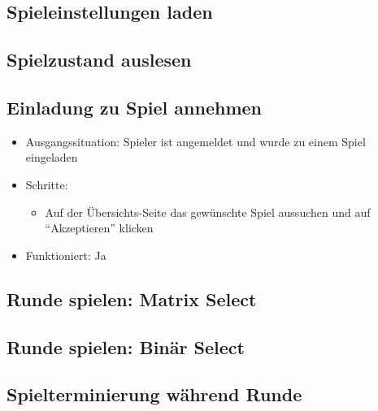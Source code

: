 \documentclass[a4paper]{scrreprt}
\begin{document}
            \subsection{Spieleinstellungen laden}

            \subsection{Spielzustand auslesen}

            \subsection{Einladung zu Spiel annehmen}
            \begin{itemize}
                \item Ausgangssituation: Spieler ist angemeldet und wurde zu einem Spiel eingeladen
                \item Schritte:
                    \begin{itemize}
                        \item Auf der Übersichts-Seite das gewünschte Spiel aussuchen und auf \enquote{Akzeptieren} klicken
                    \end{itemize}
                \item Funktioniert: Ja
            \end{itemize}

            \subsection{Runde spielen: Matrix Select}

            \subsection{Runde spielen: Binär Select}

            \subsection{Spielterminierung während Runde}
\end{document}
